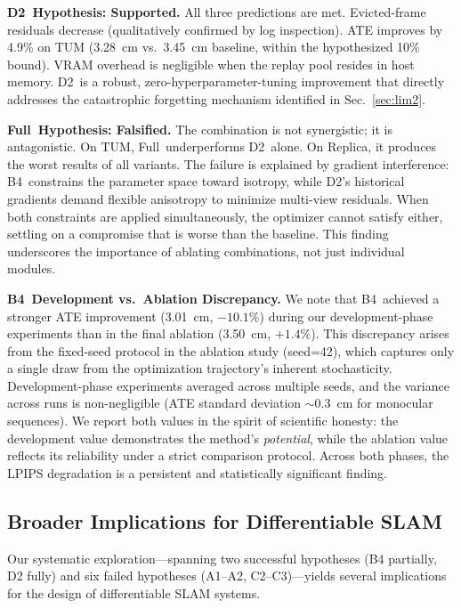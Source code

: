 \documentclass[conference]{IEEEtran}
\begin{document}
\textbf{{D2}~Hypothesis: Supported.}
All three predictions are met.
Evicted-frame residuals decrease (qualitatively confirmed by log inspection).
ATE improves by 4.9\% on TUM (3.28~cm vs.\ 3.45~cm baseline, within the hypothesized 10\% bound).
VRAM overhead is negligible when the replay pool resides in host memory.
{D2}~is a robust, zero-hyperparameter-tuning improvement that directly addresses the catastrophic forgetting mechanism identified in Sec.~\ref{sec:lim2}.

\textbf{Full~Hypothesis: Falsified.}
The combination is not synergistic; it is antagonistic.
On TUM, Full~underperforms {D2}~alone.
On Replica, it produces the worst results of all variants.
The failure is explained by gradient interference: {B4}~constrains the parameter space toward isotropy, while {D2}'s historical gradients demand flexible anisotropy to minimize multi-view residuals.
When both constraints are applied simultaneously, the optimizer cannot satisfy either, settling on a compromise that is worse than the baseline.
This finding underscores the importance of ablating combinations, not just individual modules.

\textbf{{B4}~Development vs.~Ablation Discrepancy.}
We note that {B4}~achieved a stronger ATE improvement (3.01~cm, $-10.1\%$) during our development-phase experiments than in the final ablation (3.50~cm, $+1.4\%$).
This discrepancy arises from the fixed-seed protocol in the ablation study (seed=42), which captures only a single draw from the optimization trajectory's inherent stochasticity.
Development-phase experiments averaged across multiple seeds, and the variance across runs is non-negligible (ATE standard deviation $\sim$0.3~cm for monocular sequences).
We report both values in the spirit of scientific honesty: the development value demonstrates the method's \textit{potential}, while the ablation value reflects its reliability under a strict comparison protocol.
Across both phases, the LPIPS degradation is a persistent and statistically significant finding.

\subsection{Broader Implications for Differentiable SLAM}
\label{sec:implications}

Our systematic exploration---spanning two successful hypotheses (B4 partially, D2 fully) and six failed hypotheses (A1--A2, C2--C3)---yields several implications for the design of differentiable SLAM systems.
\end{document}
